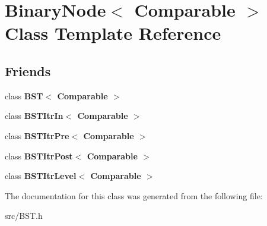 \hypertarget{class_binary_node}{}\section{Binary\+Node$<$ Comparable $>$ Class Template Reference}
\label{class_binary_node}
\subsection*{Friends}
\begin{DoxyCompactItemize}
\item 
\hypertarget{class_binary_node_a28a1adb9906f3ff7e12c2cb6fa2bd54e}{}class {\bfseries B\+S\+T$<$ Comparable $>$}\label{class_binary_node_a28a1adb9906f3ff7e12c2cb6fa2bd54e}

\item 
\hypertarget{class_binary_node_aab3993acac2ab24a0b59edb0c3acc775}{}class {\bfseries B\+S\+T\+Itr\+In$<$ Comparable $>$}\label{class_binary_node_aab3993acac2ab24a0b59edb0c3acc775}

\item 
\hypertarget{class_binary_node_a45a55df6f11541416d4ea7684c575c1a}{}class {\bfseries B\+S\+T\+Itr\+Pre$<$ Comparable $>$}\label{class_binary_node_a45a55df6f11541416d4ea7684c575c1a}

\item 
\hypertarget{class_binary_node_a5dc153694be266f6e772659486219da7}{}class {\bfseries B\+S\+T\+Itr\+Post$<$ Comparable $>$}\label{class_binary_node_a5dc153694be266f6e772659486219da7}

\item 
\hypertarget{class_binary_node_a26ff00bc0d87069aed877f10fd3c80a8}{}class {\bfseries B\+S\+T\+Itr\+Level$<$ Comparable $>$}\label{class_binary_node_a26ff00bc0d87069aed877f10fd3c80a8}

\end{DoxyCompactItemize}


The documentation for this class was generated from the following file\+:\begin{DoxyCompactItemize}
\item 
src/B\+S\+T.\+h\end{DoxyCompactItemize}
